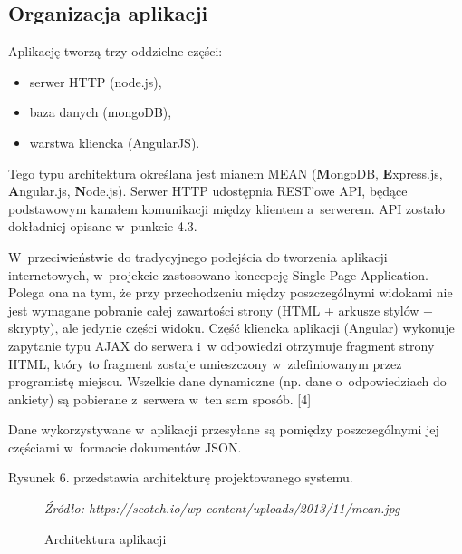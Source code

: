 \documentclass[12pt,a4paper,notitlepage]{article}
\begin{document}
\subsection{Organizacja aplikacji}
Aplikację tworzą trzy oddzielne części:
\begin{itemize}
\item serwer HTTP (node.js),
\item baza danych (mongoDB),
\item warstwa kliencka (AngularJS).
\end{itemize}
Tego typu architektura określana jest mianem MEAN (\textbf{M}ongoDB, \textbf{E}xpress.js, \newline \textbf{A}ngular.js, \textbf{N}ode.js).
Serwer HTTP udostępnia REST'owe API, będące podstawowym kanałem komunikacji między klientem a~serwerem. API zostało dokładniej opisane w~punkcie 4.3.
\par W~przeciwieństwie do tradycyjnego podejścia do tworzenia aplikacji internetowych, w~projekcie zastosowano koncepcję Single Page Application. Polega ona na tym, że przy przechodzeniu między poszczególnymi widokami nie jest wymagane pobranie całej zawartości strony (HTML + arkusze stylów + skrypty), ale jedynie części widoku. Część kliencka aplikacji (Angular) wykonuje zapytanie typu AJAX do serwera i~w odpowiedzi otrzymuje fragment strony HTML, który to fragment zostaje umieszczony w~zdefiniowanym przez programistę miejscu. Wszelkie dane dynamiczne (np. dane o~odpowiedziach do ankiety) są pobierane z~serwera w~ten sam sposób. [4]
\par Dane wykorzystywane w~aplikacji przesyłane są pomiędzy poszczególnymi jej częściami w~formacie dokumentów JSON.
\par Rysunek 6. przedstawia architekturę projektowanego systemu.

\begin{figure}[H]
\begin{center}
\caption{Architektura aplikacji}
\end{center}
\textit{Źródło: https://scotch.io/wp-content/uploads/2013/11/mean.jpg}
\end{figure}
\end{document}
